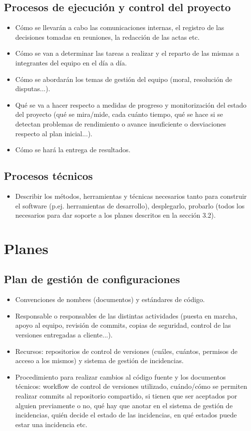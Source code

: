 \subsection{Procesos de ejecución y control del proyecto}
\begin{itemize}
	\item Cómo se llevarán a cabo las comunicaciones internas, el registro de las decisiones tomadas en reuniones, la redacción de las actas etc.
	\item Cómo se van a determinar las tareas a realizar y el reparto de las mismas a integrantes del equipo en el día a día.
	\item Cómo se abordarán los temas de gestión del equipo (moral, resolución de disputas...).
	\item Qué se va a hacer respecto a medidas de progreso y monitorización del estado del proyecto (qué se mira/mide, cada cuánto tiempo, qué se hace si se detectan problemas de rendimiento o avance insuficiente o desviaciones respecto al plan inicial...).
	\item Cómo se hará la entrega de resultados.
\end{itemize}

\subsection{Procesos técnicos}
\begin{itemize}
	\item Describir los métodos, herramientas y técnicas necesarios tanto para construir el software (p.ej. herramientas de desarrollo), desplegarlo, probarlo (todos los necesarios para dar soporte a los planes descritos en la sección 3.2).\\
\end{itemize}

\section{Planes}
\subsection{Plan de gestión de configuraciones}
\begin{itemize}
	\item Convenciones de nombres (documentos) y estándares de código.
	\item Responsable o responsables de las distintas actividades (puesta en marcha, apoyo al equipo, revisión de commits, copias de seguridad, control de las versiones entregadas a cliente...).
	\item Recursos: repositorios de control de versiones (cuáles, cuántos, permisos de acceso a los mismos) y sistema de gestión de incidencias.
	\item Procedimiento para realizar cambios al código fuente y los documentos técnicos: workflow de control de versiones utilizado, cuándo/cómo se permiten realizar commits al repositorio compartido, si tienen que ser aceptados por alguien previamente o no, qué hay que anotar en el sistema de gestión de incidencias, quién decide el estado de las incidencias, en qué estados puede estar una incidencia etc.
\end{itemize}

